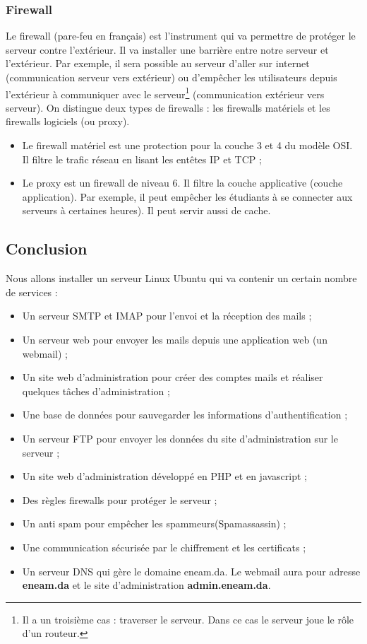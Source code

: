 \documentclass[a4paper,12pt,french]{report} %
\begin{document}
\subsubsection{Firewall}
Le firewall (pare-feu en français) est l'instrument qui va permettre de protéger le serveur contre l'extérieur. Il va installer une barrière entre notre serveur et l'extérieur. Par exemple, il sera possible au serveur d'aller sur internet (communication serveur vers extérieur) ou d'empêcher les utilisateurs depuis l'extérieur à communiquer avec le serveur\footnote{Il a un troisième cas : traverser le serveur. Dans ce cas le serveur joue le rôle d'un routeur.} (communication extérieur vers serveur). On distingue deux types de firewalls : les firewalls matériels et les firewalls logiciels (ou proxy).
\begin{itemize}
\item Le firewall matériel est une protection pour la couche 3 et 4 du modèle OSI. Il filtre le trafic réseau en lisant les entêtes IP et TCP ;
\item Le proxy est un firewall de niveau 6. Il filtre la couche applicative (couche application). Par exemple, il peut empêcher les étudiants à se connecter aux serveurs à certaines heures). Il peut servir aussi de cache.
\end{itemize}

\subsection*{Conclusion}
Nous allons installer un serveur Linux Ubuntu qui va contenir un certain nombre de services :
\begin{itemize}
	\item Un serveur SMTP et IMAP pour l'envoi et la réception des mails ;
	\item Un serveur web pour envoyer les mails depuis une application web (un webmail) ;
	\item Un site web d'administration pour créer des comptes mails et réaliser quelques tâches d'administration ;
	\item Une base de données pour sauvegarder les informations d'authentification ; 
	\item Un serveur FTP pour envoyer les données du site d'administration sur le serveur ;
	\item Un site web d'administration développé en PHP et en javascript ; 
	\item Des règles firewalls pour protéger le serveur ; 
	\item Un anti spam pour empêcher les spammeurs(Spamassassin) ;
	\item Une communication sécurisée par le chiffrement et les certificats ;
	\item Un serveur DNS qui gère le domaine eneam.da. Le webmail aura pour adresse \textbf{eneam.da} et le site d'administration \textbf{admin.eneam.da}.
\end{itemize}
\end{document}
